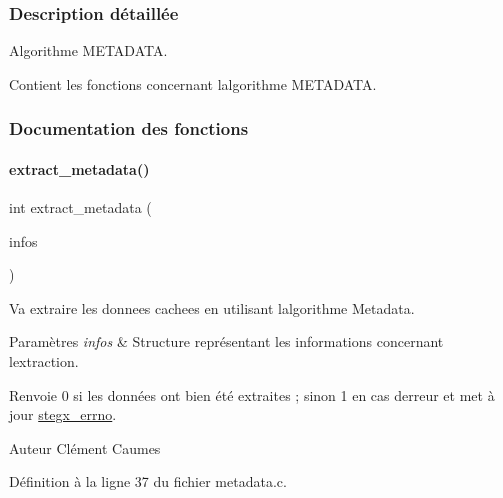 \subsubsection{Description détaillée}
Algorithme M\+E\+T\+A\+D\+A\+TA. 

Contient les fonctions concernant l\textquotesingle{}algorithme M\+E\+T\+A\+D\+A\+TA. 

\subsubsection{Documentation des fonctions}
\mbox{\label{a00038_a069239660c8070698c4ddcbbd6debe0b}} 
\paragraph{\texorpdfstring{extract\+\_\+metadata()}{extract\_metadata()}}
{\footnotesize\ttfamily int extract\+\_\+metadata (\begin{DoxyParamCaption}\item[{\hyperlink{a00008_aa8ca908d92fb5bdd3c0a9e1f58b2cf03}{info\+\_\+s} $\ast$}]{infos }\end{DoxyParamCaption})}



Va extraire les donnees cachees en utilisant l\textquotesingle{}algorithme Metadata. 


\begin{DoxyParams}{Paramètres}
{\em infos} & Structure représentant les informations concernant l\textquotesingle{}extraction. \\
\hline
\end{DoxyParams}
\begin{DoxyReturn}{Renvoie}
0 si les données ont bien été extraites ; sinon 1 en cas d\textquotesingle{}erreur et met à jour \hyperlink{a00062_a5ec48ccdfbe19fe23855818f8556abec}{stegx\+\_\+errno}. 
\end{DoxyReturn}
\begin{DoxyAuthor}{Auteur}
Clément Caumes 
\end{DoxyAuthor}


Définition à la ligne 37 du fichier metadata.\+c.

